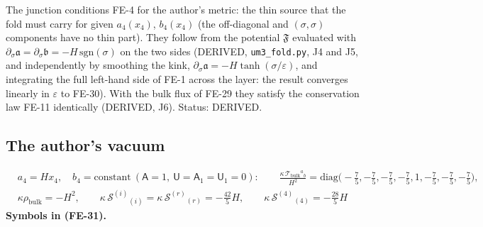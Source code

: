 \documentclass[
  10pt,
]{article}
\begin{document}
The junction conditions FE-4 for the author's metric: the thin source
that the fold must carry for given \(a_4(x_4)\), \(b_4(x_4)\) (the
off-diagonal and \((\sigma, \sigma)\) components have no thin part).
They follow from the potential \(\mathfrak{F}\) evaluated with
\(\partial_\sigma\mathfrak{a} = \partial_\sigma\mathfrak{b} = -H\,\mathrm{sgn}(\sigma)\)
on the two sides (DERIVED, \texttt{um3\_fold.py}, J4 and J5, and
independently by smoothing the kink,
\(\partial_\sigma\mathfrak{a} = -H\tanh(\sigma/\varepsilon)\), and
integrating the full left-hand side of FE-1 across the layer: the result
converges linearly in \(\varepsilon\) to FE-30). With the bulk flux of
FE-29 they satisfy the conservation law FE-11 identically (DERIVED, J6).
Status: DERIVED.

\hypertarget{the-authors-vacuum}{%
\subsection{The author's vacuum}\label{the-authors-vacuum}}

\[
\begin{aligned}
&a_4 = Hx_4,\quad b_4 = \text{constant}\ (\mathsf{A} = 1,\ \mathsf{U} = \mathsf{A}_1 = \mathsf{U}_1 = 0):\qquad
 \frac{\kappa\,\mathcal{T}_{\mathrm{bulk}}{}^a{}_b}{H^2} = \mathrm{diag}\Big(-\frac75, -\frac75, -\frac75, -\frac75, 1, -\frac75, -\frac75, -\frac75\Big),\\
&\kappa\rho_{\mathrm{bulk}} = -H^2,\qquad \kappa\,\mathcal{S}^{(i)}{}_{(i)} = \kappa\,\mathcal{S}^{(r)}{}_{(r)} = -\frac{42}{5}H,\qquad
 \kappa\,\mathcal{S}^{(4)}{}_{(4)} = -\frac{28}{5}H
\end{aligned} \tag{FE-31}
\] \textbf{Symbols in (FE-31).}
\end{document}
